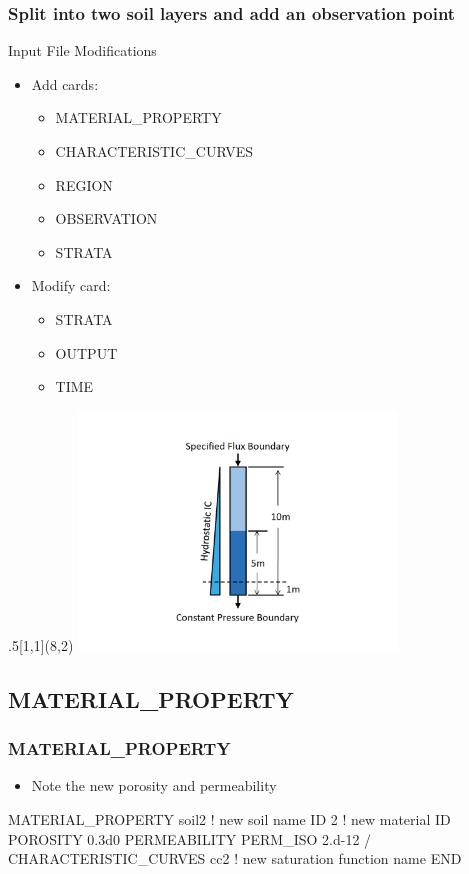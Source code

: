 \documentclass{beamer}
\newcommand\bluecomment[1]{{{\color{blue} #1}}}
\newcommand\magentacomment[1]{{{\color{magenta} #1}}}
\begin{document}
\begin{frame}[fragile]\frametitle{Split into two soil layers and add an observation point}

Input File Modifications
\begin{itemize}
\item Add cards:
  \begin{itemize}
    \item MATERIAL\_PROPERTY
    \item CHARACTERISTIC\_CURVES
    \item REGION
    \item OBSERVATION
    \item STRATA
  \end{itemize}
\item Modify card:
  \begin{itemize}
    \item STRATA
    \item OUTPUT
    \item TIME
   \end{itemize}
\end{itemize}
\begin{textblock}{.5}[1,1](8,2)
\includegraphics[height=2.5in]{./vsat_flow_layered}
\end{textblock} 
\end{frame}


\subsection{MATERIAL\_PROPERTY}

\begin{frame}[fragile]\frametitle{MATERIAL\_PROPERTY}

\begin{itemize}
\item Note the new porosity and permeability
\end{itemize}

\begin{semiverbatim}
\magentacomment{
MATERIAL_PROPERTY soil2    \bluecomment{! new soil name}
  ID 2                     \bluecomment{! new material ID}
  POROSITY 0.3d0
  PERMEABILITY
    PERM_ISO 2.d-12
  /
  CHARACTERISTIC\_CURVES cc2 \bluecomment{! new saturation function name}
END}
\end{semiverbatim}

\end{frame}
\end{document}
